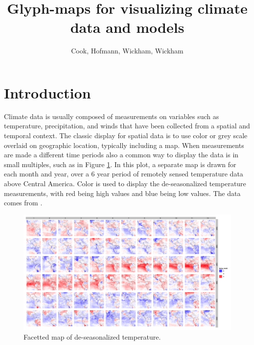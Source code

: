 \documentclass[oneside]{article}
\begin{document}
\title{Glyph-maps for visualizing climate data and models}
\author{Cook, Hofmann, Wickham, Wickham}


%
%
\maketitle

\section{Introduction}

Climate data is usually composed of measurements on variables such as temperature, precipitation, and winds that have been collected from a spatial and temporal context. The classic display for spatial data is to use color or grey scale overlaid on geographic location, typically including a map. When measurements are made a different time periods also a common way to display the data is in small multiples, such as in Figure \ref{fig:facetted-map}. In this plot, a separate map is drawn for each month and year, over a 6 year period of remotely sensed temperature data above Central America. Color is used to display the de-seasonalized temperature measurements, with red being high values and blue being low values. The data  comes from \cite{NASA-Data-Expo}.


\begin{figure}[htp]
\includegraphics[width=6in]{nasa-colored-map.png}
\caption{Facetted map of de-seasonalized temperature.}
\label{fig:facetted-map}
\end{figure}
\end{document}
